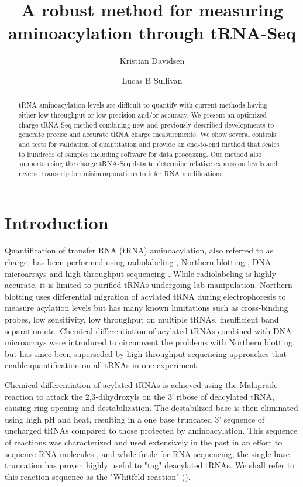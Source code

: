 \documentclass[9pt,lineno]{elife}
\title{A robust method for measuring aminoacylation through tRNA-Seq}
\author[1,2]{Kristian Davidsen}
\author[1*]{Lucas B Sullivan}
\affil[1]{Fred Hutchinson Cancer Center}
\affil[2]{Molecular and cellular biology program, University of Washington}
\begin{document}
\maketitle

\begin{abstract}
tRNA aminoacylation levels are difficult to quantify with current methods having either low throughput or low precision and/or accuracy.
We present an optimized charge tRNA-Seq method combining new and previously described developments to generate precise and accurate tRNA charge measurements.
We show several controls and tests for validation of quantitation and provide an end-to-end method that scales to hundreds of samples including software for data processing.
Our method also supports using the charge tRNA-Seq data to determine relative expression levels and reverse transcription misincorporations to infer RNA modifications.
\end{abstract}



\section{Introduction}
Quantification of transfer RNA (tRNA) aminoacylation, also referred to as charge, has been performed using radiolabeling \citep{Wolfson2002-gp}, Northern blotting \citep{Ho1987-ug, Varshney1991-zp, Stenum2017-wn}, DNA microarrays \citep{Dittmar2005-va} and high-throughput sequencing \citep{Evans2017-st}.
While radiolabeling is highly accurate, it is limited to purified tRNAs undergoing lab manipulation.
Northern blotting uses differential migration of acylated tRNA during electrophoresis to measure acylation levels but has many known limitations such as cross-binding probes, low sensitivity, low throughput on multiple tRNAs, insufficient band separation etc.
Chemical differentiation of acylated tRNAs combined with DNA microarrays were introduced to circumvent the problems with Northern blotting, but has since been superseded by high-throughput sequencing approaches that enable quantification on all tRNAs in one experiment.

Chemical differentiation of acylated tRNAs is achieved using the Malaprade reaction to attack the 2,3-dihydroxyls on the 3′ ribose of deacylated tRNA, causing ring opening and destabilization.
The destabilized base is then eliminated using high pH and heat, resulting in a one base truncated 3' sequence of uncharged tRNAs compared to those protected by aminoacylation.
This sequence of reactions was characterized and used extensively in the past in an effort to sequence RNA molecules \citep{Whitfeld1953-ca, Whitfeld1954-wl, Khym1961-xf, Neu1964-hu}, and while futile for RNA sequencing, the single base truncation has proven highly useful  to "tag" deacylated tRNAs.
We shall refer to this reaction sequence as the "Whitfeld reaction" ().
\end{document}

